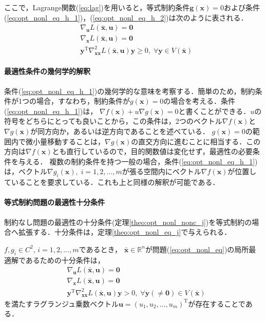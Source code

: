 \documentclass{jsreport}
\begin{document}
ここで，Lagrange関数(\ref{eq:lag})を用いると，等式制約条件$\bm{g}(\bm{x}) = 0$および条件(\ref{eq:opt_nonl_eq_h_1})，(\ref{eq:opt_nonl_eq_h_2})は次のように表される．
\begin{align}
  &\nabla_{\bm{u}} L(\bar{\bm{x}}, \bm{u}) = \bm{0} \nonumber \\
  &\nabla_{\bm{x}} L(\bar{\bm{x}}, \bm{u}) = \bm{0} \nonumber \\
  &\bm{y}^{\mathrm{T}} {\nabla}^2_{\bm{xx}} L(\bar{\bm{x}}, \bm{u}) \bm{y} \geq 0, \; \forall \bm{y} \in V(\bar{\bm{x}}) \nonumber
\end{align}

\paragraph{最適性条件の幾何学的解釈}
条件(\ref{eq:opt_nonl_eq_h_1})の幾何学的な意味を考察する．簡単のため，制約条件が1つの場合，すなわち，制約条件が$g(\bm{x}) = 0$の場合を考える．条件(\ref{eq:opt_nonl_eq_h_1})は，
$\nabla f(\bm{x}) + u \nabla g(\bm{x}) = 0$と書くことができる．$u$の符号をどちらにとっても良いことから，この条件は，2つのベクトル$\nabla f(\bm{x})$と$\nabla g(\bm{x})$が同方向か，あるいは逆方向であることを述べている．
$g(\bm{x}) = 0$の範囲内で微小量移動することは，$\nabla g(\bm{x})$の直交方向に進むことに相当する．この方向は$\nabla f(\bm{x})$とも直行しているので，目的関数値は変化せず，最適性の必要条件を与える．
複数の制約条件を持つ一般の場合，条件(\ref{eq:opt_nonl_eq_h_1})は，ベクトル$\nabla g_i(\bm{x}), \; i = 1, 2, \ldots, m$が張る空間内にベクトル$\nabla f(\bm{x})$が位置していることを要求している．これも上と同様の解釈が可能である．


\paragraph{等式制約問題の最適性十分条件}
制約なし問題の最適性の十分条件(定理\ref{theo:opt_nonl_nonc_j})を等式制約の場合へ拡張する．十分条件は，定理\ref{theo:opt_nonl_eq_j}で与えられる．
\begin{theo}\label{theo:opt_nonl_eq_j}
  $f, g_i \in C^2, \, i = 1, 2, \ldots, m$であるとき，
  $\bar{\bm{x}} \in \mathbb{R}^n$が問題(\ref{eq:opt_nonl_eq})の局所最適解であるための十分条件は，
  \begin{align}
    &\nabla_{\bm{u}} L(\bar{\bm{x}}, \bm{u}) = \bm{0} \nonumber \\
    &\nabla_{\bm{x}} L(\bar{\bm{x}}, \bm{u}) = \bm{0} \nonumber \\
    &\bm{y}^{\mathrm{T}} {\nabla}^2_{\bm{xx}} L(\bar{\bm{x}}, \bm{u}) \bm{y} > 0, \; \forall \bm{y}(\neq \bm{0}) \in V(\bar{\bm{x}}) \nonumber
  \end{align}
  を満たすラグランジュ乗数ベクトル$\bm{u} = (u_1, u_2, \ldots, u_m)^{\mathrm{T}}$が存在することである．
\end{theo}
\end{document}
